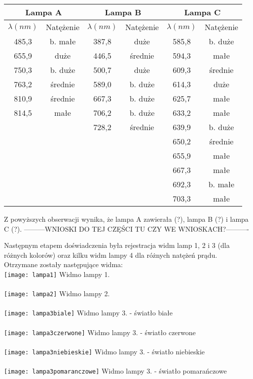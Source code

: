 \documentclass[10pt,a4paper]{article}
\begin{document}
\begin{center}
\begin{tabular}{|c|c|c|c|c|c|}
\multicolumn{2}{c}{Lampa A} & \multicolumn{2}{c}{Lampa B} & \multicolumn{2}{c}{Lampa C}\\
\hline
$\lambda (nm)$ & Natężenie & $\lambda (nm)$ & Natężenie & $\lambda (nm)$ & Natężenie\\
\hline
485,3 & b. małe & 387,8 & duże & 585,8 & b. duże\\
\hline
655,9 & duże & 446,5 & średnie & 594,3 & małe \\
\hline
750,3 & b. duże & 500,7 & duże & 609,3 & średnie \\
\hline
763,2 & średnie & 589,0 & b. duże & 614,3 & duże \\
\hline
810,9 & średnie & 667,3 & b. duże & 625,7 & małe \\
\hline
814,5 & małe & 706,2 & b. duże & 633,2 & małe \\
\hline
&& 728,2 & średnie & 639,9 & b. duże \\
\hline
&&&& 650,2 & średnie \\
\hline
&&&& 655,9 & małe \\
\hline
&&&& 667,3 & małe \\
\hline
&&&& 692,3 & b. małe \\
\hline
&&&& 703,3 & małe \\
\hline

\end{tabular}
\end{center}

Z powyższych obserwacji wynika, że lampa A zawierała (?), lampa B (?) i lampa C (?).
---------WNIOSKI DO TEJ CZĘŚCI TU CZY WE WNIOSKACH?----------

Następnym etapem doświadczenia była rejestracja widm lamp 1, 2 i 3 (dla różnych kolorów) oraz kilku widm lampy 4 dla różnych natężeń prądu. Otrzymane zostały następujące widma:\\

\texttt{[image: lampa1]}
Widmo lampy 1.\\
\\
\texttt{[image: lampa2]}
Widmo lampy 2.\\
\\

\texttt{[image: lampa3biale]}
Widmo lampy 3. - światło białe\\
\\
\texttt{[image: lampa3czerwone]}
Widmo lampy 3. - światło czerwone\\
\\
\texttt{[image: lampa3niebieskie]}
Widmo lampy 3. - światło niebieskie\\
\\
\texttt{[image: lampa3pomaranczowe]}
Widmo lampy 3. - światło pomarańczowe\\
\\
\end{document}
